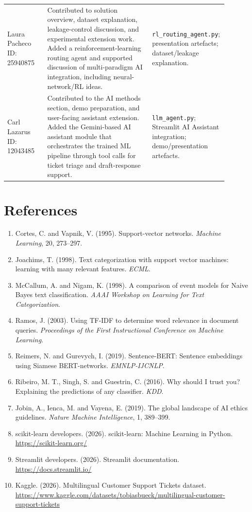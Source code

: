\documentclass[11pt,a4paper]{article}
\begin{document}
\begin{longtable}{>{\raggedright\arraybackslash}p{0.18\linewidth} >{\raggedright\arraybackslash}p{0.47\linewidth} >{\raggedright\arraybackslash}p{0.25\linewidth}}
Laura Pacheco \newline ID: 25940875 & Contributed to solution overview, dataset explanation, leakage-control discussion, and experimental extension work. Added a reinforcement-learning routing agent and supported discussion of multi-paradigm AI integration, including neural-network/RL ideas. & \texttt{rl\_routing\_agent.py}; presentation artefacts; dataset/leakage explanation.\\
\addlinespace
Carl Lazarus \newline ID: 12043485 & Contributed to the AI methods section, demo preparation, and user-facing assistant extension. Added the Gemini-based AI assistant module that orchestrates the trained ML pipeline through tool calls for ticket triage and draft-response support. & \texttt{llm\_agent.py}; Streamlit AI Assistant integration; demo/presentation artefacts.\\
\bottomrule
\end{longtable}
\normalsize

\section{References}
\begin{enumerate}
  \item Cortes, C. and Vapnik, V. (1995). Support-vector networks. \textit{Machine Learning}, 20, 273--297.
  \item Joachims, T. (1998). Text categorization with support vector machines: learning with many relevant features. \textit{ECML}.
  \item McCallum, A. and Nigam, K. (1998). A comparison of event models for Naive Bayes text classification. \textit{AAAI Workshop on Learning for Text Categorization}.
  \item Ramos, J. (2003). Using TF-IDF to determine word relevance in document queries. \textit{Proceedings of the First Instructional Conference on Machine Learning}.
  \item Reimers, N. and Gurevych, I. (2019). Sentence-BERT: Sentence embeddings using Siamese BERT-networks. \textit{EMNLP-IJCNLP}.
  \item Ribeiro, M. T., Singh, S. and Guestrin, C. (2016). Why should I trust you? Explaining the predictions of any classifier. \textit{KDD}.
  \item Jobin, A., Ienca, M. and Vayena, E. (2019). The global landscape of AI ethics guidelines. \textit{Nature Machine Intelligence}, 1, 389--399.
  \item scikit-learn developers. (2026). scikit-learn: Machine Learning in Python. \url{https://scikit-learn.org/}
  \item Streamlit developers. (2026). Streamlit documentation. \url{https://docs.streamlit.io/}
  \item Kaggle. (2026). Multilingual Customer Support Tickets dataset. \url{https://www.kaggle.com/datasets/tobiasbueck/multilingual-customer-support-tickets}
\end{enumerate}
\end{document}
